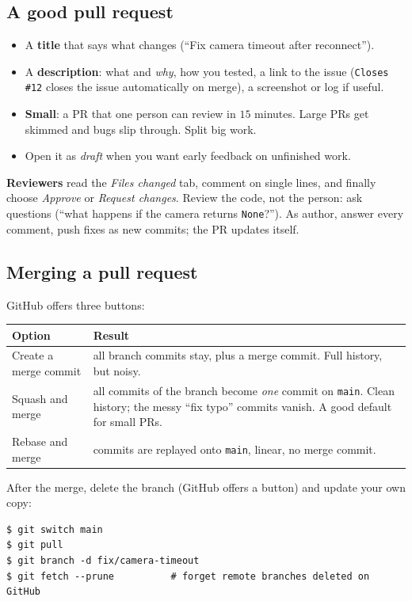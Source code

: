 \subsection*{A good pull request}
\begin{itemize}[nosep]
  \item A \textbf{title} that says what changes (``Fix camera timeout after reconnect'').
  \item A \textbf{description}: what and \emph{why}, how you tested, a link to the issue (\texttt{Closes \#12} closes the issue automatically on merge), a screenshot or log if useful.
  \item \textbf{Small}: a PR that one person can review in $15$ minutes. Large PRs get skimmed and bugs slip through. Split big work.
  \item Open it as \emph{draft} when you want early feedback on unfinished work.
\end{itemize}
\textbf{Reviewers} read the \emph{Files changed} tab, comment on single lines, and finally choose \emph{Approve} or \emph{Request changes}. Review the code, not the person: ask questions (``what happens if the camera returns \texttt{None}?''). As author, answer every comment, push fixes as new commits; the PR updates itself.

\subsection*{Merging a pull request}
GitHub offers three buttons:
\begin{center}
\renewcommand{\arraystretch}{1.25}
\begin{tabular}{p{3.4cm}p{9.8cm}}
\textbf{Option} & \textbf{Result}\\ \hline
Create a merge commit & all branch commits stay, plus a merge commit. Full history, but noisy.\\
Squash and merge & all commits of the branch become \emph{one} commit on \texttt{main}. Clean history; the messy ``fix typo'' commits vanish. A good default for small PRs.\\
Rebase and merge & commits are replayed onto \texttt{main}, linear, no merge commit.\\
\end{tabular}
\end{center}
After the merge, delete the branch (GitHub offers a button) and update your own copy:
\begin{verbatim}
$ git switch main
$ git pull
$ git branch -d fix/camera-timeout
$ git fetch --prune          # forget remote branches deleted on GitHub
\end{verbatim}

